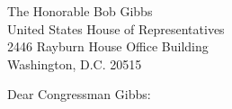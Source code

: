 

\begin{letter}{

The Honorable Bob Gibbs\\
United States House of Representatives\\
2446 Rayburn House Office Building\\
Washington, D.C. 20515

}
\opening{Dear Congressman Gibbs:}


\blockB{}


\end{letter}

